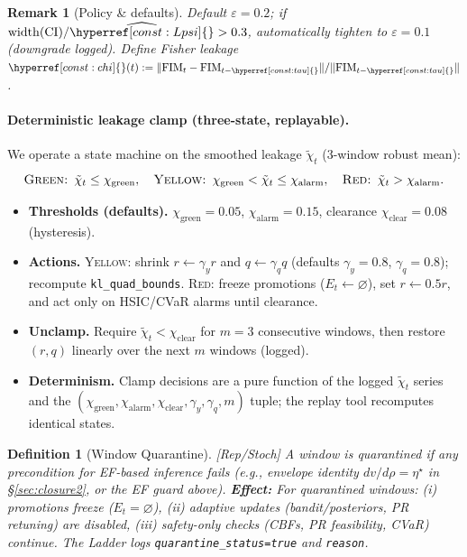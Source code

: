 \documentclass[10pt]{article}
\newcommand{\FIM}{\mathrm{FIM}}
\newcommand{\cutq}{q}
\newcommand{\layertag}[1]{\textup{[#1]}}
\newcommand{\constref}[1]{\hyperref[const:#1]{\ensuremath{\csname constsym#1\endcsname}}}
\newtheorem{definition}{Definition}
\newtheorem{remark}{Remark}
\begin{document}
\begin{remark}[Policy \& defaults]\label{rem:eps-policy}
Default $\varepsilon=0.2$; if $\mathrm{width}(\text{CI})/\widehat{\constref{Lpsi}}>0.3$, automatically tighten to $\varepsilon=0.1$ (downgrade logged).
Define Fisher leakage $\constref{chi}(t):=\|\FIM_{t}-\FIM_{t-\constref{tau}}\|/\|\FIM_{t-\constref{tau}}\|$.
\end{remark}

\paragraph{Deterministic leakage clamp (three-state, replayable).}
We operate a state machine on the smoothed leakage $\tilde\chi_t$ (3-window robust mean):
\[
\textsc{Green: } \tilde\chi_t\le \chi_{\mathrm{green}},\quad
\textsc{Yellow: } \chi_{\mathrm{green}}<\tilde\chi_t\le \chi_{\mathrm{alarm}},\quad
\textsc{Red: } \tilde\chi_t>\chi_{\mathrm{alarm}}.
\]
\begin{itemize}[leftmargin=*]
\item \textbf{Thresholds (defaults).} $\chi_{\mathrm{green}}{=}0.05$, $\chi_{\mathrm{alarm}}{=}0.15$, clearance $\chi_{\mathrm{clear}}{=}0.08$ (hysteresis).
\item \textbf{Actions.} \textsc{Yellow}: shrink $r\leftarrow \gamma_y r$ and $\cutq\leftarrow \gamma_q\cutq$ (defaults $\gamma_y{=}0.8$, $\gamma_q{=}0.8$); recompute \texttt{kl\_quad\_bounds}. \textsc{Red}: freeze promotions ($E_t\!\leftarrow\!\varnothing$), set $r\leftarrow 0.5r$, and act only on HSIC/CVaR alarms until clearance.
\item \textbf{Unclamp.} Require $\tilde\chi_t<\chi_{\mathrm{clear}}$ for $m{=}3$ consecutive windows, then restore $(r,\cutq)$ linearly over the next $m$ windows (logged).
\item \textbf{Determinism.} Clamp decisions are a pure function of the logged $\tilde\chi_t$ series and the $(\chi_{\mathrm{green}},\chi_{\mathrm{alarm}},\chi_{\mathrm{clear}},\gamma_y,\gamma_q,m)$ tuple; the replay tool recomputes identical states.
\end{itemize}

\begin{definition}[Window Quarantine]\label{def:win-quarantine}
\emph{\layertag{Rep/Stoch}}
A window is \emph{quarantined} if any precondition for EF-based inference fails (e.g., envelope identity $dv/d\rho=\eta^\star$ in \S\ref{sec:closure2}, or the EF guard above).
\textbf{Effect:} For quarantined windows: (i) promotions freeze ($E_t\!=\!\varnothing$), (ii) adaptive updates (bandit/posteriors, PR retuning) are disabled, (iii) safety-only checks (CBFs, PR feasibility, CVaR) continue. The Ladder logs \texttt{quarantine\_status=true} and \texttt{reason}.
\end{definition}
\end{document}
